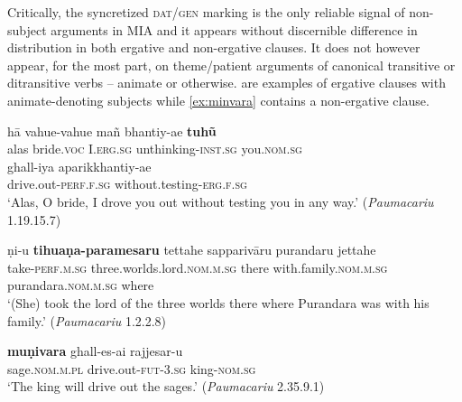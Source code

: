 \documentclass[output=paper,
modfonts
]{LSP/langsci}
\begin{document}
Critically, the syncretized \textsc{dat/gen}  marking  is the only reliable signal of non-subject arguments in MIA and it appears without discernible difference in distribution in both ergative and non-ergative clauses. It does not however appear, for the most part,  on theme/patient arguments of canonical transitive or ditransitive verbs -- animate or otherwise.  are examples of ergative clauses with animate-denoting subjects while \cref{ex:minvara} contains a non-ergative clause. 

\begin{exe}
\ex\label{nompatients}
\begin{xlist}
\ex\label{ex:ha}\gll hā vahue-vahue mañ bhantiy-ae    \textbf{tuhũ}\\
alas  bride.\textsc{voc} I.\textsc{erg.sg} unthinking-\textsc{inst.sg}  you.\textsc{nom.sg}\\

\gll ghall-iya aparikkhantiy-ae \\
drive.out-\textsc{perf.f.sg} without.testing-\textsc{erg.f.sg} \\ \glt `Alas, O bride, I drove you out without testing you in any way.' (\textit{Paumacariu} 1.19.15.7)

\ex\label{ex:niu}\gll ṇi-u \textbf{tihuaṇa-paramesaru} tettahe    sapparivāru purandaru jettahe \\
take-\textsc{perf.m.sg} three.worlds.lord.\textsc{nom.m.sg} there with.family.\textsc{nom.m.sg} purandara.\textsc{nom.m.sg} where \\ \glt `(She) took the lord of the three worlds there where Purandara was with his family.' (\textit{Paumacariu} 1.2.2.8)

\ex\label{ex:minvara}\gll \textbf{muṇivara} ghall-es-ai rajjesar-u \\
sage.\textsc{nom.m.pl} drive.out-\textsc{fut-3.sg}  king-\textsc{nom.sg} \\
\glt `The king will drive out the sages.' (\textit{Paumacariu} 2.35.9.1)
\end{xlist}
\end{exe}

\end{document}
